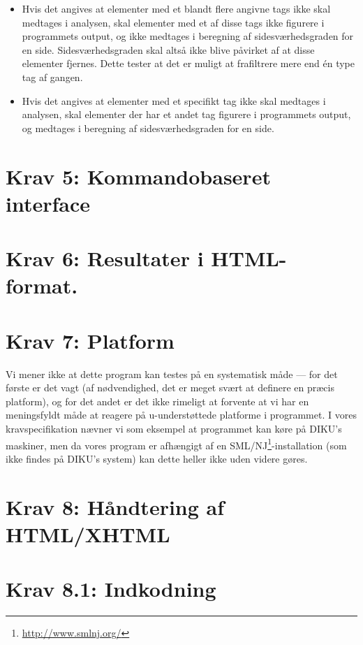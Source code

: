 \documentclass[a4paper,oneside,article, titlepage]{memoir}
\begin{document}
\begin{itemize}
\item Hvis det angives at elementer med et blandt flere angivne tags
  ikke skal medtages i analysen, skal elementer med et af disse tags
  ikke figurere i programmets output, og ikke medtages i beregning af
  sidesværhedsgraden for en side. Sidesværhedsgraden skal altså ikke
  blive påvirket af at disse elementer fjernes. Dette tester at det er
  muligt at frafiltrere mere end én type tag af gangen.
\item Hvis det angives at elementer med et specifikt tag ikke skal
  medtages i analysen, skal elementer der har et andet tag figurere i
  programmets output, og medtages i beregning af sidesværhedsgraden
  for en side.
\end{itemize}

\section*{Krav 5: Kommandobaseret interface}

\section*{Krav 6: Resultater i HTML-format.}

\section*{Krav 7: Platform}

Vi mener ikke at dette program kan testes på en systematisk måde ---
for det første er det vagt (af nødvendighed, det er meget svært at
definere en præcis platform), og for det andet er det ikke rimeligt at
forvente at vi har en meningsfyldt måde at reagere på u-understøttede
platforme i programmet. I vores kravspecifikation nævner vi som
eksempel at programmet kan køre på DIKU's maskiner, men da vores
program er afhængigt af en
SML/NJ\footnote{\url{http://www.smlnj.org/}}-installation (som ikke
findes på DIKU's system) kan dette heller ikke uden videre gøres.

\section*{Krav 8: Håndtering af HTML/XHTML}

\section*{Krav 8.1: Indkodning}
\end{document}

